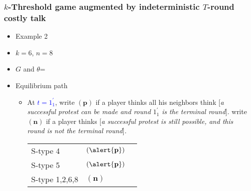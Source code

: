 \documentclass[9pt]{beamer}
\begin{document}
\begin{frame}
  \frametitle{$k$-Threshold game augmented by indeterministic $T$-round costly talk}

\begin{itemize}
\item Example 2
\item $k=6$, $n=8$
\item $G$ and $\theta$=
\begin{center}
\end{center}
\end{itemize}

\begin{itemize}
\item Equilibrium path
\begin{itemize}
\item 
{
At \textcolor{blue}{$t=1^{'}_1$}, write $({\textbf{p}})$ if a player thinks all his neighbors think \alert{[}\textit{a successful protest can be made and round $1^{'}_1$ is the terminal round}\alert{]}. write $({\textbf{n}})$ if a player thinks \alert{[}\textit{a successful protest is still possible, and this round is not the terminal round}\alert{]}. 
\begin{table}[h]
\begin{tabular}{ll l}
S-type 4 & $(\alert{\textbf{p}})$\\
S-type 5 & $(\alert{\textbf{p}})$\\
S-type 1,2,6,8 & $(\textbf{n})$
\end{tabular}
\end{table}
}
\end{itemize}
\end{itemize}
\end{frame}
\end{document}
